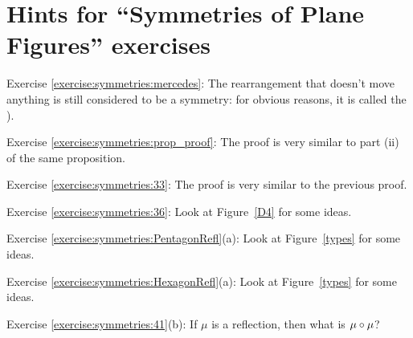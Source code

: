 \section{Hints for ``Symmetries of Plane Figures'' exercises}\label{sec:Symmetry:Hints}

\noindent Exercise \ref{exercise:symmetries:mercedes}: The rearrangement that doesn't move anything is still considered to be a symmetry: for obvious reasons, it is called the ).

\noindent Exercise \ref{exercise:symmetries:prop_proof}: The proof is very similar to part (ii) of the same proposition.

\noindent Exercise \ref{exercise:symmetries:33}: The proof is very similar to the previous proof.

\noindent Exercise \ref{exercise:symmetries:36}: Look at Figure~\ref{D4} for some ideas.

\noindent Exercise \ref{exercise:symmetries:PentagonRefl}(a): Look at Figure~\ref{types} for some ideas.

\noindent Exercise \ref{exercise:symmetries:HexagonRefl}(a): Look at Figure~\ref{types} for some ideas.

\noindent Exercise \ref{exercise:symmetries:41}(b): If $\mu$ is a reflection, then what is $\mu \circ \mu$?
